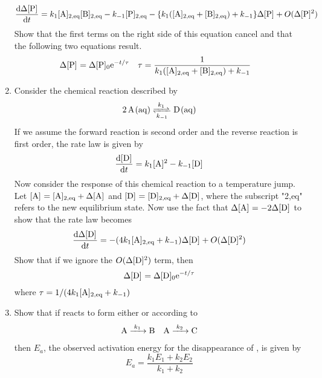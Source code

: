 \documentclass[../psets.tex]{subfiles}
\begin{document}
\begin{enumerate}[label={\textbf{28-\arabic*.}},leftmargin=3.5em]
    \begin{equation*}
        \dv{\Delta\cnc{P}}{t} = k_1\cnc[2,eq]{A}\cnc[2,eq]{B}-k_{-1}\cnc[2,eq]{P}-\{k_1(\cnc[2,eq]{A}+\cnc[2,eq]{B})+k_{-1}\}\Delta\cnc{P}+O(\Delta\cnc{P}^2)
    \end{equation*}
    Show that the first terms on the right side of this equation cancel and that the following two equations result.
    \begin{align*}
        \Delta\cnc{P} &= \Delta\cnc[0]{P}\e[-t/\tau]&
        \tau &= \frac{1}{k_1(\cnc[2,eq]{A}+\cnc[2,eq]{B})+k_{-1}}
    \end{align*}
    \setcounter{enumi}{35}
    \item Consider the chemical reaction described by
    \begin{equation*}
        \ce{2A(aq) <=>[$k_1$][$k_{-1}$] D(aq)}
    \end{equation*}
    If we assume the forward reaction is second order and the reverse reaction is first order, the rate law is given by
    \begin{equation*}
        \dv{\cnc{D}}{t} = k_1\cnc{A}^2-k_{-1}\cnc{D}
    \end{equation*}
    Now consider the response of this chemical reaction to a temperature jump. Let $\cnc{A}=\cnc[2,eq]{A}+\Delta\cnc{A}$ and $\cnc{D}=\cnc[2,eq]{D}+\Delta\cnc{D}$, where the subscript "2,eq" refers to the new equilibrium state. Now use the fact that $\Delta\cnc{A}=-2\Delta\cnc{D}$ to show that the rate law becomes
    \begin{equation*}
        \dv{\Delta\cnc{D}}{t} = -(4k_1\cnc[2,eq]{A}+k_{-1})\Delta\cnc{D}+O(\Delta\cnc{D}^2)
    \end{equation*}
    Show that if we ignore the $O(\Delta\cnc{D}^2)$ term, then
    \begin{equation*}
        \Delta\cnc{D} = \Delta\cnc[0]{D}\e[-t/\tau]
    \end{equation*}
    where $\tau=1/(4k_1\cnc[2,eq]{A}+k_{-1})$
    \setcounter{enumi}{45}
    \item Show that if  reacts to form either  or  according to
    \begin{align*}
        \ce{A ->[$k_1$] B}&&
        \ce{A ->[$k_2$] C}
    \end{align*}
    then $E_a$, the observed activation energy for the disappearance of , is given by
    \begin{equation*}
        E_a = \frac{k_1E_1+k_2E_2}{k_1+k_2}
    \end{equation*}

\end{enumerate}
\end{document}
